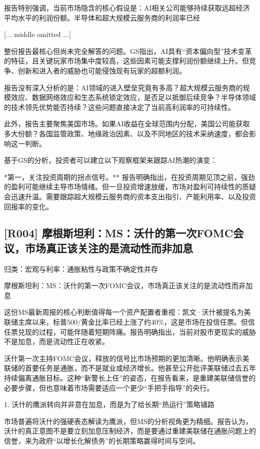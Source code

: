 \documentclass[11pt]{ctexart}
\begin{document}
报告特别强调，当前市场隐含的核心假设是：AI相关公司能够持续获取远超经济平均水平的利润份额。半导体和超大规模云服务商的利润率已经

[... middle omitted ...]

整份报告最核心但尚未完全解答的问题。GS指出，AI具有“资本偏向型”技术变革的特征，且关键玩家市场集中度较高，这些因素可能支撑利润份额继续上升。但竞争、创新和进入者的威胁也可能侵蚀现有玩家的超额利润。

报告没有深入分析的是：AI领域的进入壁垒究竟有多高？超大规模云服务商的规模效应、数据网络效应和生态系统锁定效应，是否足以抵御后续竞争？半导体领域的技术领先优势能否持续？这些问题直接决定了当前高利润率的可持续性。

此外，报告主要聚焦美国市场。如果AI收益在全球范围内分配，美国公司能获取多大份额？各国监管政策、地缘政治因素、以及不同地区的技术采纳速度，都会影响这一判断。

基于GS的分析，投资者可以建立以下观察框架来跟踪AI热潮的演变：

*第一，关注投资周期的拐点信号。** 报告明确指出，在投资周期见顶之前，强劲的盈利可能继续主导市场情绪。但一旦投资增速放缓，市场对盈利可持续性的质疑会迅速升温。需要跟踪超大规模云服务商的资本支出指引、产能利用率、以及投资回报率的变化。

\subsection{[R004] 摩根斯坦利：MS：沃什的第一次FOMC会议，市场真正该关注的是流动性而非加息}
{\small\color{refgray}归类：宏观与利率：通胀粘性与政策不确定性并存}

摩根斯坦利：MS：沃什的第一次FOMC会议，市场真正该关注的是流动性而非加息

这份MS最新周报的核心判断值得每一个资产配置者重视：凯文·沃什被提名为美联储主席以来，标普500/黄金比率已经上涨了约40\%，这是市场在投信任票。但信任票兑现的过程，可能伴随着短期阵痛。报告明确指出，当前对股市更现实的威胁不是加息，而是流动性正在收紧。

沃什第一次主持FOMC会议，释放的信号比市场预期的更加清晰。他明确表示美联储的首要任务是通胀，而不是就业或经济增长。他甚至公开批评美联储过去五年持续偏离通胀目标。这种“新警长上任”的姿态，在报告看来，是重建美联储信誉的必要步骤，但也意味着市场需要适应一个更少“手把手指导”的央行。

1. 沃什的鹰派转向并非意在加息，而是为了给长期“热运行”策略铺路

市场普遍将沃什的强硬表态解读为鹰派，但MS的分析视角更为精细。报告认为，沃什的真正意图不是要立刻加息压制经济，而是要通过重建美联储在通胀问题上的信誉，来为政府“以增长化解债务”的长期策略赢得时间与空间。
\end{document}
